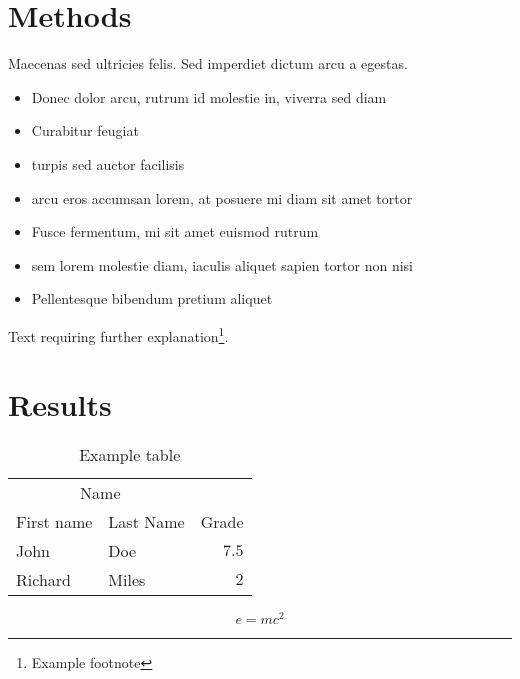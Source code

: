 \documentclass[twoside,twocolumn]{article}
\begin{document}
 

\section{Methods}

Maecenas sed ultricies felis. Sed imperdiet dictum arcu a egestas. 
\begin{itemize}
\item Donec dolor arcu, rutrum id molestie in, viverra sed diam
\item Curabitur feugiat
\item turpis sed auctor facilisis
\item arcu eros accumsan lorem, at posuere mi diam sit amet tortor
\item Fusce fermentum, mi sit amet euismod rutrum
\item sem lorem molestie diam, iaculis aliquet sapien tortor non nisi
\item Pellentesque bibendum pretium aliquet
\end{itemize}
\blindtext %

Text requiring further explanation\footnote{Example footnote}.


\section{Results}

\begin{table}
\caption{Example table}
\centering
\begin{tabular}{llr}
\toprule
\multicolumn{2}{c}{Name} \\
\cmidrule(r){1-2}
First name & Last Name & Grade \\
\midrule
John & Doe & $7.5$ \\
Richard & Miles & $2$ \\
\bottomrule
\end{tabular}
\end{table}

\blindtext %

\begin{equation}
\label{eq:emc}
e = mc^2
\end{equation}

\blindtext %

\end{document}
